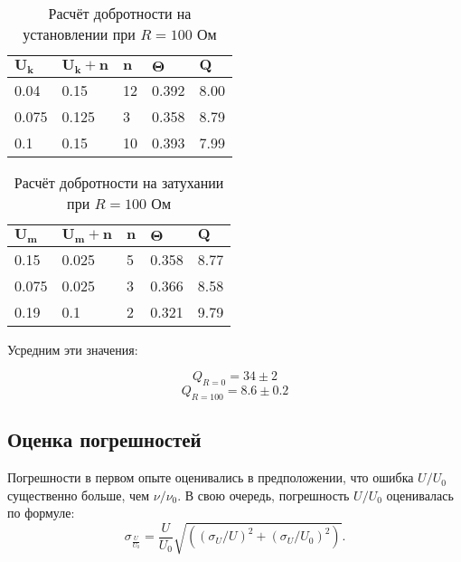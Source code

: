 \documentclass[a4paper]{article}
\begin{document}
\begin{table}[h!]
	\centering
	\begin{tabular}{|l|l|l|l|l|}
		\hline
		$\mathbf{U_k}$ & $\mathbf{U_k+n}$ & $\mathbf{n}$ & $\mathbf{\Theta}$ & $\mathbf{Q}$ \\ \hline
		0.04           & 0.15             & 12           & 0.392             & 8.00         \\ \hline
		0.075          & 0.125            & 3            & 0.358             & 8.79         \\ \hline
		0.1            & 0.15             & 10           & 0.393             & 7.99         \\ \hline
	\end{tabular}
\caption{Расчёт добротности на установлении при $R=100$ Ом}
\end{table}

\begin{table}[h!]
	\centering
	\begin{tabular}{|l|l|l|l|l|}
		\hline
		$\mathbf{U_m}$ & $\mathbf{U_m+n}$ & $\mathbf{n}$ & $\mathbf{\Theta}$ & $\mathbf{Q}$ \\ \hline
		0.15           & 0.025            & 5            & 0.358             & 8.77         \\ \hline
		0.075          & 0.025            & 3            & 0.366             & 8.58         \\ \hline
		0.19           & 0.1              & 2            & 0.321             & 9.79         \\ \hline
	\end{tabular}
\caption{Расчёт добротности на затухании при $R=100$ Ом}
\end{table}

Усредним эти значения:

\begin{equation}\label{key}
	Q_{R=0} = 34 \pm 2
\end{equation}
\begin{equation}\label{key}
	Q_{R=100} = 8.6 \pm 0.2
\end{equation}

\subsection{Оценка погрешностей}
Погрешности в первом опыте оценивались в предположении, что ошибка $U/U_0$ существенно больше, чем $\nu/\nu_0$. В свою очередь, погрешность $U/U_0$ оценивалась по формуле:
\begin{equation}\label{key}
	\sigma_{\frac{U}{U_0}}=\frac{U}{U_0} \sqrt{((\sigma_U/U)^2+(\sigma_U/U_0)^2)}.
\end{equation}
\end{document}
